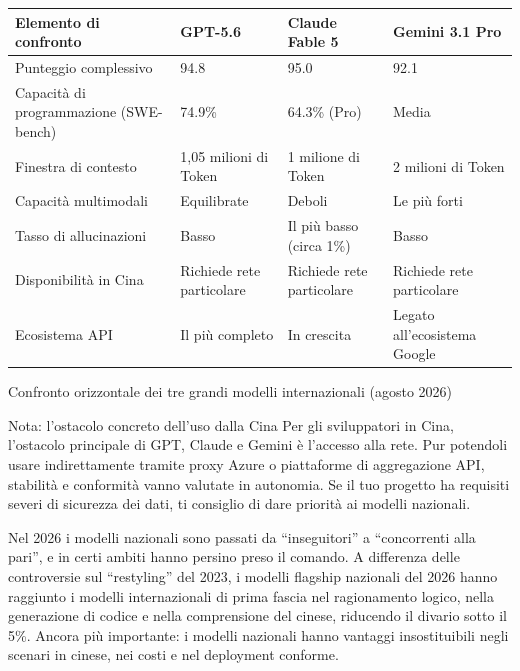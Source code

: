 \begin{center}
\begin{tabularx}{\linewidth}{|X|X|X|X|}
\hline
\textbf{Elemento di confronto} & \textbf{GPT-5.6} & \textbf{Claude Fable 5} & \textbf{Gemini 3.1 Pro} \tabularnewline
\hline
Punteggio complessivo & 94.8 & 95.0 & 92.1 \tabularnewline
Capacità di programmazione (SWE-bench) & 74.9\% & 64.3\% (Pro) & Media \tabularnewline
Finestra di contesto & 1,05 milioni di Token & 1 milione di Token & 2 milioni di Token \tabularnewline
Capacità multimodali & Equilibrate & Deboli & Le più forti \tabularnewline
Tasso di allucinazioni & Basso & Il più basso (circa 1\%) & Basso \tabularnewline
Disponibilità in Cina & Richiede rete particolare & Richiede rete particolare & Richiede rete particolare \tabularnewline
Ecosistema API & Il più completo & In crescita & Legato all'ecosistema Google \tabularnewline
\hline
\end{tabularx}
\end{center}

\begin{center}\small\color{gray}Confronto orizzontale dei tre grandi modelli internazionali (agosto 2026)\end{center}

\begin{tcbwarn}{Nota: l'ostacolo concreto dell'uso dalla Cina}
Per gli sviluppatori in Cina, l'ostacolo principale di GPT, Claude e Gemini è l'accesso alla rete. Pur potendoli usare indirettamente tramite proxy Azure o piattaforme di aggregazione API, stabilità e conformità vanno valutate in autonomia. Se il tuo progetto ha requisiti severi di sicurezza dei dati, ti consiglio di dare priorità ai modelli nazionali.

\end{tcbwarn}


Nel 2026 i modelli nazionali sono passati da “inseguitori” a “concorrenti alla pari”, e in certi ambiti hanno persino preso il comando. A differenza delle controversie sul “restyling” del 2023, i modelli flagship nazionali del 2026 hanno raggiunto i modelli internazionali di prima fascia nel ragionamento logico, nella generazione di codice e nella comprensione del cinese, riducendo il divario sotto il 5\%. Ancora più importante: i modelli nazionali hanno vantaggi insostituibili negli scenari in cinese, nei costi e nel deployment conforme.



